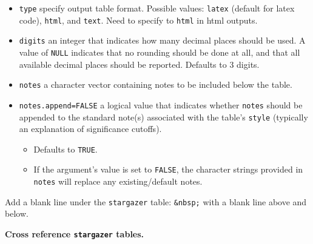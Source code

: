 \documentclass[
  a4paper,
  twoside,
  openright]{book}
\providecommand{\tightlist}{%
  \setlength{\itemsep}{0pt}\setlength{\parskip}{0pt}}
\theoremstyle{definition}
\theoremstyle{definition}
\theoremstyle{definition}
\theoremstyle{definition}
\theoremstyle{remark}
\begin{document}
\begin{itemize}
\tightlist
\item
  \texttt{type} specify output table format. Possible values: \texttt{latex} (default for latex code), \texttt{html}, and \texttt{text}. Need to specify to \texttt{html} in html outputs.
\item
  \texttt{digits} an integer that indicates how many decimal places should be used. A value of \texttt{NULL} indicates that no rounding should be done at all, and that all available decimal places should be reported. Defaults to 3 digits.
\item
  \texttt{notes} a character vector containing notes to be included below the table.
\item
  \texttt{notes.append=FALSE} a logical value that indicates whether \texttt{notes} should be appended to the standard note(s) associated with the table's \texttt{style} (typically an explanation of significance cutoffs).

  \begin{itemize}
  \tightlist
  \item
    Defaults to \texttt{TRUE}.
  \item
    If the argument's value is set to \texttt{FALSE}, the character strings provided in \texttt{notes} will replace any existing/default notes.
  \end{itemize}
\end{itemize}

Add a blank line under the \texttt{stargazer} table: \texttt{\&nbsp;} with a blank line above and below.

\textbf{Cross reference \texttt{stargazer} tables.}
\end{document}
